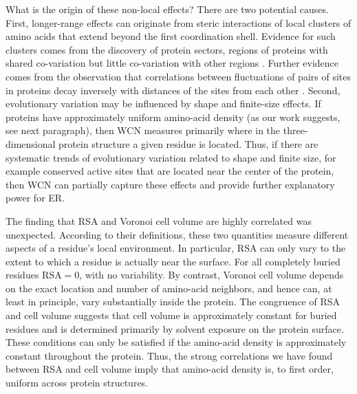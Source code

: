 \documentclass[12pt]{article}
\begin{document}
    What is the origin of these non-local effects? There are two potential causes. First, longer-range effects can originate from steric interactions of local clusters of amino acids that extend beyond the first coordination shell. Evidence for such clusters comes from the discovery of protein sectors, regions of proteins with shared co-variation but little co-variation with other regions \cite{Halabietal2009}. Further evidence comes from the observation that correlations between fluctuations of pairs of sites in proteins decay inversely with distances of the sites from each other \cite{dehouck_effective_2013}. Second, evolutionary variation may be influenced by shape and finite-size effects. If proteins have approximately uniform amino-acid density (as our work suggests, see next paragraph), then WCN measures primarily where in the three-dimensional protein structure a given residue is located. Thus, if there are systematic trends of evolutionary variation related to shape and finite size, for example conserved active sites that are located near the center of the protein, then WCN can partially capture these effects and provide further explanatory power for ER.
    
The finding that RSA and Voronoi cell volume are highly correlated was unexpected. According to their definitions, these two quantities measure different aspects of a residue's local environment. In particular, RSA can only vary to the extent to which a residue is actually near the surface. For all completely buried residues $\text{RSA}=0$, with no variability. By contrast, Voronoi cell volume depends on the exact location and number of amino-acid neighbors, and hence can, at least in principle, vary substantially inside the protein. The congruence of RSA and cell volume suggests that cell volume is approximately constant for buried residues and is determined primarily by solvent exposure on the protein surface. These conditions can only be satisfied if the amino-acid density is approximately constant throughout the protein. Thus, the strong correlations we have found between RSA and cell volume imply that amino-acid density is, to first order, uniform across protein structures.
\end{document}
